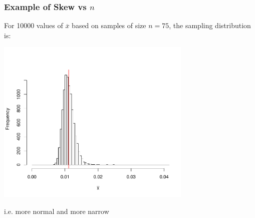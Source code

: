 \documentclass[handout]{beamer}
\newcommand{\blue}[1]{\textcolor{blue2}{#1}}
\newcommand{\xbar}{\overline{x}}
\begin{document}
\begin{frame}
\frametitle{Example of Skew vs $n$}
For 10000 values of $\xbar$ based on samples of size \blue{$n=75$}, the sampling distribution is:
\begin{center}
\includegraphics[width=0.7\textwidth]{figure/hist75.pdf}
\end{center}
\blue{i.e. more normal and more narrow}
\end{frame}
\end{document}
